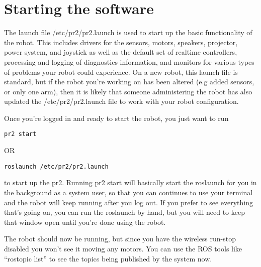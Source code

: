 \section{Starting the software}
The launch file /etc/pr2/pr2.launch is used to start up the basic functionality of the robot.  This includes drivers for the sensors, motors, speakers, projector, power system, and joystick as well as the default set of realtime controllers, processing and logging of diagnostics information, and monitors for various types of problems your robot could experience.  On a new robot, this launch file is standard, but if the robot you're working on has been altered (e.g added sensors, or only one arm), then it is likely that someone administering the robot has also updated the /etc/pr2/pr2.launch file to work with your robot configuration.

Once you're logged in and ready to start the robot, you just want to run
\begin{verbatim}
pr2 start
\end{verbatim}
OR
\begin{verbatim}
roslaunch /etc/pr2/pr2.launch
\end{verbatim}
to start up the pr2.  Running pr2 start will basically start the roslaunch for you in the background as a system user, so that you can continues to use your terminal and the robot will keep running after you log out.  If you prefer to see everything that's going on, you can run the roslaunch by hand, but you will need to keep that window open until you're done using the robot. 

The robot should now be running, but since you have the wireless run-stop disabled you won't see it moving any motors.  You can use the ROS tools like ``rostopic list'' to see the topics being published by the system now.

